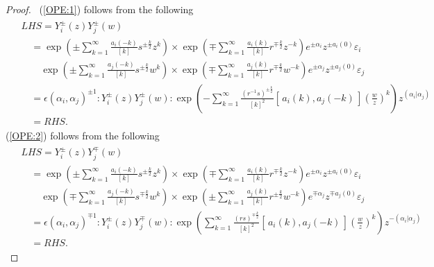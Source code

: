 \documentclass{amsproc}
\theoremstyle{remark}
\numberwithin{equation}{section}
\begin{document}
\begin{proof}\, (\ref{OPE:1}) follows from the following
\begin{eqnarray*}
\begin{split}
&LHS=Y_i^{\pm}(z)Y_j^{\pm}(w)\\
&\quad=\exp (\pm  \sum^{\infty}_{k=1}
                 \frac{a_i(-k)}{[k]} s^{\pm\frac{k}{2}} z^k)\times\exp ( \mp \sum^{\infty}_{k=1}
           \frac{a_i(k)   }{[k]} r^{\mp \frac{k}{2}} z^{-k})
         e^{\pm{\alpha}_i} z^{\pm a_i(0)}{\varepsilon}_i \\
&\qquad\exp (\pm  \sum^{\infty}_{k=1}
                 \frac{a_j(-k)}{[k]} s^{\pm\frac{k}{2}} w^k)\times\exp ( \mp \sum^{\infty}_{k=1}
           \frac{a_j(k)   }{[k]} r^{\mp \frac{k}{2}} w^{-k})
         e^{\pm{\alpha}_j} z^{\pm a_j(0)}{\varepsilon}_j\\
&\quad=\epsilon(\alpha_i,\alpha_j)^{\pm1}:Y_i^{\pm}(z)Y_j^{\pm}(w):\exp (-\sum^{\infty}_{k=1}
           \frac{(r^{-1}s)^{\pm \frac{k}{2}}}{[k]^2}[\,a_i(k), a_j(-k)\,] (\frac{w}{z})^{k})z^{(\alpha_i|\alpha_j)}\\
           &\quad=RHS.
\end{split}
\end{eqnarray*}
(\ref{OPE:2}) follows from the following
\begin{eqnarray*}
\begin{split}
&LHS=Y_i^{\pm}(z)Y_j^{\mp}(w)\\
&\quad=\exp (\pm  \sum^{\infty}_{k=1}
                 \frac{a_i(-k)}{[k]} s^{\pm\frac{k}{2}} z^k)\times\exp ( \mp \sum^{\infty}_{k=1}
           \frac{a_i(k)   }{[k]} r^{\mp \frac{k}{2}} z^{-k})
         e^{\pm{\alpha}_i} z^{\pm a_i(0)}{\varepsilon}_i \\
&\qquad\exp (\mp  \sum^{\infty}_{k=1}
                 \frac{a_j(-k)}{[k]} s^{\mp\frac{k}{2}} w^k)\times\exp ( \pm \sum^{\infty}_{k=1}
           \frac{a_j(k)   }{[k]} r^{\pm \frac{k}{2}} w^{-k})
         e^{\mp{\alpha}_j} z^{\mp a_j(0)}{\varepsilon}_j\\
&\quad=\epsilon(\alpha_i,\alpha_j)^{\mp1}:Y_i^{\pm}(z)Y_j^{\mp}(w):\exp (\sum^{\infty}_{k=1}
           \frac{(rs)^{\mp \frac{k}{2}}}{[k]^2}[\,a_i(k), a_j(-k)\,] (\frac{w}{z})^{k})z^{-(\alpha_i|\alpha_j)}\\
           &\quad=RHS.
\end{split}
\end{eqnarray*}


\end{proof}
\end{document}
